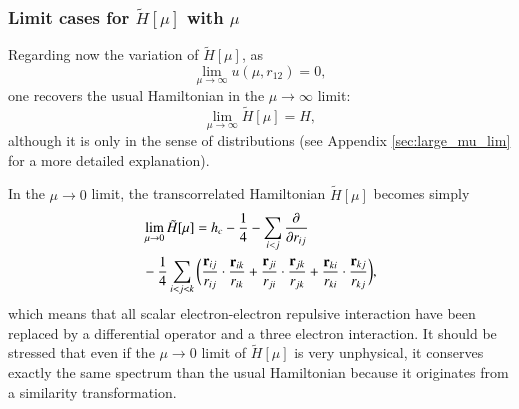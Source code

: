 \documentclass[aip,jcp,reprint,noshowkeys,superscriptaddress,twocolumn]{revtex4-1}
\newcommand{\deriv}[3]{\frac{\partial^{#3} #1}{\partial {#2}^{#3}}}
\newcommand{\bri}[1]{{\bf r}_{#1}}
\begin{document}
\subsubsection{Limit cases for $\tilde{H}[\mu]$ with $\mu$}
\label{sec:h_mu_lim}
Regarding now the variation of $\tilde{H}[\mu]$, as 
\begin{equation}
 \label{eq:lim_mu_0}
 \lim_{\mu  \rightarrow \infty }u(\mu,r_{12}) = 0, 
\end{equation}
one recovers the usual Hamiltonian in the ${\mu  \rightarrow \infty }$ limit:
\begin{equation}
 \label{eq:lim_mu_1}
 \lim_{\mu \rightarrow \infty} \tilde{H}[\mu] = H,
\end{equation}
although it is only in the sense of distributions (see Appendix \ref{sec:large_mu_lim} for a more detailed explanation). 

In the $\mu \rightarrow 0$ limit, the transcorrelated Hamiltonian $\tilde{H}[\mu]$ becomes simply 
\begin{equation}
 \label{eq:htilde_mu_low}
 \begin{aligned}
&\lim_{\mu \rightarrow 0} \tilde{H}[\mu] = h_c - \frac{1}{4} - \sum_{i<j}\deriv{}{r_{ij}}{} \\
 & - \frac{1}{4}\sum_{i<j<k}  \bigg(\frac{\bri{ij} }{ r_{ij}} \cdot \frac{\bri{ik} }{ r_{ik}} + \frac{\bri{ji} }{ r_{ji}} \cdot \frac{\bri{jk}  }{ r_{jk}} + \frac{\bri{ki} }{ r_{ki}} \cdot  \frac{\bri{kj} }{ r_{kj}} \bigg),
 \end{aligned}
\end{equation}
which means that all scalar electron-electron repulsive interaction have been replaced by a differential operator and a three electron interaction. 
It should be stressed that even if the $\mu \rightarrow 0$ limit of $\tilde{H}[\mu]$ is very unphysical, it conserves exactly the same spectrum than the usual Hamiltonian because it originates from a similarity transformation. 
\end{document}
